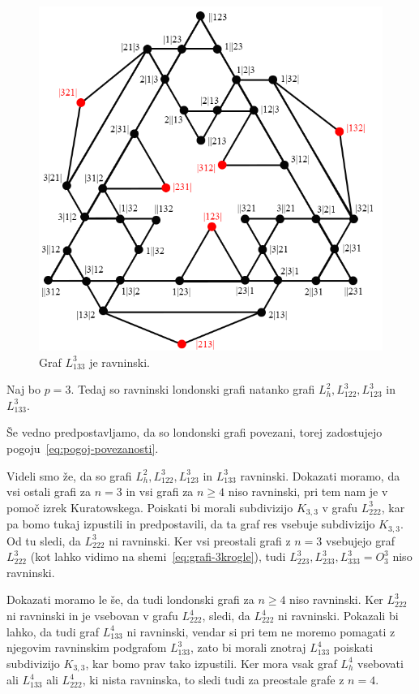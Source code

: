 \documentclass[twoside,11pt]{article}
\begin{document}
\begin{figure}[h]
    \includegraphics[width=350pt]{img/L_133.png}
    \caption{Graf $L^3_{133}$ je ravninski.}
    \label{fig:L^3_133}
\end{figure}

\begin{trditev}
    Naj bo $p=3$. Tedaj so ravninski londonski grafi natanko grafi $L_h^2, L_{122}^3, L_{123}^3$ in $L_{133}^3$.
\end{trditev}

\begin{opomba}
    Še vedno predpostavljamo, da so londonski grafi povezani, torej zadostujejo pogoju~\eqref{eq:pogoj-povezanosti}.
\end{opomba}

Videli smo že, da so grafi $L_h^2, L_{122}^3, L_{123}^3$ in $L_{133}^3$ ravninski. Dokazati moramo, da vsi ostali grafi za $n=3$ in vsi grafi za $n \geq 4$ niso ravninski, pri tem nam je v pomoč izrek Kuratowskega. Poiskati bi morali subdivizijo $K_{3,3}$ v grafu $L_{222}^3$, kar pa bomo tukaj izpustili in predpostavili, da ta graf res vsebuje subdivizijo $K_{3,3}$. Od tu sledi, da $L_{222}^3$ ni ravninski. Ker vsi preostali grafi z $n = 3$ vsebujejo graf $L_{222}^3$ (kot lahko vidimo na shemi~\eqref{eq:grafi-3krogle}), tudi $L_{223}^3, L_{233}^3, L_{333}^3=O^3_3$ niso ravninski.

Dokazati moramo le še, da tudi londonski grafi za $n\geq 4$ niso ravninski.
Ker $L_{222}^3$ ni ravninski in je vsebovan v grafu $L_{222}^4$, sledi, da $L_{222}^4$ ni ravninski. Pokazali bi lahko, da tudi graf $L_{133}^4$ ni ravninski, vendar si pri tem ne moremo pomagati z njegovim ravninskim podgrafom $L_{133}^3$, zato bi morali znotraj $L_{133}^4$ poiskati subdivizijo $K_{3,3}$, kar bomo prav tako izpustili.
Ker mora vsak graf $L_h^4$ vsebovati ali $L_{133}^4$ ali $L_{222}^4$, ki nista ravninska, to sledi tudi za preostale grafe z $n=4$.
\end{document}
